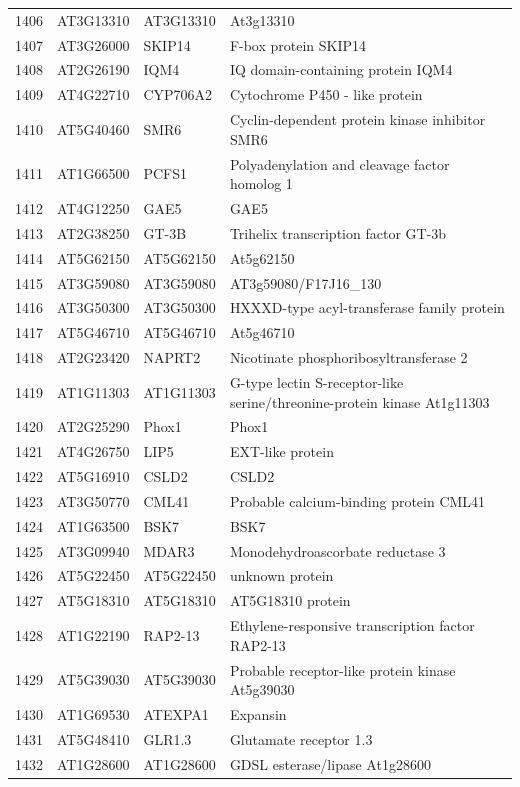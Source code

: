 \documentclass[11pt]{article}
\begin{document}
\begin{center}
\begin{tabular}{rlll}
1406 & AT3G13310 & AT3G13310 & At3g13310\\
1407 & AT3G26000 & SKIP14 & F-box protein SKIP14\\
1408 & AT2G26190 & IQM4 & IQ domain-containing protein IQM4\\
1409 & AT4G22710 & CYP706A2 & Cytochrome P450 - like protein\\
1410 & AT5G40460 & SMR6 & Cyclin-dependent protein kinase inhibitor SMR6\\
1411 & AT1G66500 & PCFS1 & Polyadenylation and cleavage factor homolog 1\\
1412 & AT4G12250 & GAE5 & GAE5\\
1413 & AT2G38250 & GT-3B & Trihelix transcription factor GT-3b\\
1414 & AT5G62150 & AT5G62150 & At5g62150\\
1415 & AT3G59080 & AT3G59080 & AT3g59080/F17J16\_130\\
1416 & AT3G50300 & AT3G50300 & HXXXD-type acyl-transferase family protein\\
1417 & AT5G46710 & AT5G46710 & At5g46710\\
1418 & AT2G23420 & NAPRT2 & Nicotinate phosphoribosyltransferase 2\\
1419 & AT1G11303 & AT1G11303 & G-type lectin S-receptor-like serine/threonine-protein kinase At1g11303\\
1420 & AT2G25290 & Phox1 & Phox1\\
1421 & AT4G26750 & LIP5 & EXT-like protein\\
1422 & AT5G16910 & CSLD2 & CSLD2\\
1423 & AT3G50770 & CML41 & Probable calcium-binding protein CML41\\
1424 & AT1G63500 & BSK7 & BSK7\\
1425 & AT3G09940 & MDAR3 & Monodehydroascorbate reductase 3\\
1426 & AT5G22450 & AT5G22450 & unknown protein\\
1427 & AT5G18310 & AT5G18310 & AT5G18310 protein\\
1428 & AT1G22190 & RAP2-13 & Ethylene-responsive transcription factor RAP2-13\\
1429 & AT5G39030 & AT5G39030 & Probable receptor-like protein kinase At5g39030\\
1430 & AT1G69530 & ATEXPA1 & Expansin\\
1431 & AT5G48410 & GLR1.3 & Glutamate receptor 1.3\\
1432 & AT1G28600 & AT1G28600 & GDSL esterase/lipase At1g28600\\

\end{tabular}
\end{center}
\end{document}

